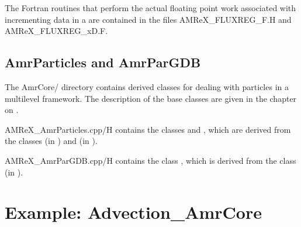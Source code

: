 \documentclass[letterpaper,10pt,english]{sphinxmanual}
\begin{document}
\sphinxAtStartPar
The Fortran routines that perform the actual floating point work associated with
incrementing data in a  are contained in the files
AMReX\_FLUXREG\_F.H and AMReX\_FLUXREG\_xD.F.


\subsection{AmrParticles and AmrParGDB}
\label{\detokenize{AmrCore:amrparticles-and-amrpargdb}}
\sphinxAtStartPar
The AmrCore/ directory contains derived classes for dealing with particles
in a multi\sphinxhyphen{}level framework. The description of the base classes
are given in the chapter on {\hyperref[\detokenize{Particle_Chapter:chap-particles}]{}}.

\sphinxAtStartPar
AMReX\_AmrParticles.cpp/H contains the classes 
and , which are derived from the classes
 (in )
and  (in ).

\sphinxAtStartPar
AMReX\_AmrParGDB.cpp/H contains the class , which is derived from
the class  (in ).


\section{Example: Advection\_AmrCore}
\label{\detokenize{AmrCore:example-advection-amrcore}}
\end{document}
